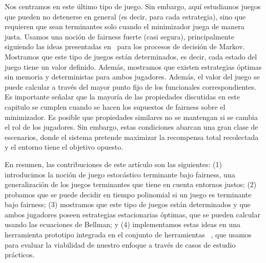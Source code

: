 	    Nos centramos en este último tipo de juego. Sin embargo, aquí estudiamos juegos que pueden no detenerse en general (es decir, para cada estrategia), sino que requieren que sean terminantes solo cuando el minimizador juega de manera justa.
        Usamos una noción de fairness fuerte (casi segura), principalmente siguiendo las ideas presentadas en~\cite{DBLP:journals/dc/BaierK98} para los procesos de decisión de Markov. Mostramos que este tipo de juegos están determinados, es decir, cada estado del juego tiene un valor definido. Además, mostramos que existen estrategias óptimas sin memoria y deterministas para ambos jugadores. Además, el valor del juego se puede calcular a través del mayor punto fijo de los funcionales correspondientes.
Es importante señalar que la mayoría de las propiedades discutidas en este capitulo se cumplen cuando se hacen los supuestos de fairness sobre el minimizador. Es posible que propiedades similares no se mantengan si se cambia el rol de los jugadores.
Sin embargo, estas condiciones abarcan una gran clase de escenarios, donde el sistema pretende maximizar la recompensa total recolectada y el entorno tiene el objetivo opuesto.

En resumen, las contribuciones de este artículo son las siguientes: (1) introducimos la noción de juego estocástico terminante bajo fairness, una generalización de los juegos terminantes que tiene en cuenta entornos justos; (2) probamos que se puede decidir en tiempo polinomial si un juego es terminante bajo fairness; (3) mostramos que este tipo de juegos están determinados y que ambos jugadores poseen estrategias estacionarias óptimas, que se pueden calcular usando las ecuaciones de Bellman; y (4) implementamos estas ideas en una herramienta prototipo integrada en el conjunto de herramientas {\PrismGames}~\cite{DBLP:conf/cav/KwiatkowskaN0S20}, que usamos para evaluar la viabilidad de nuestro enfoque a través de casos de estudio prácticos.



